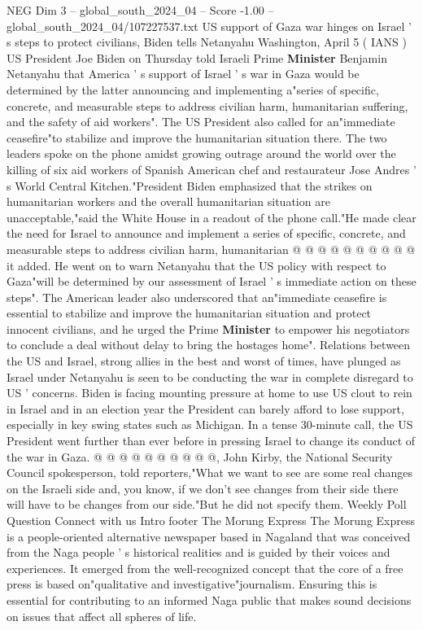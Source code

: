 \begin{textsample}{NEG Dim 3 – global\_south\_2024\_04 – Score -1.00 – global\_south\_2024\_04/107227537.txt}  \label{ex:f3_neg_244}
US support of Gaza war hinges on Israel ' s steps to protect civilians, Biden tells Netanyahu Washington, April 5 ( IANS ) US President Joe Biden on Thursday told Israeli Prime \textbf{Minister} Benjamin Netanyahu that America ' s support of Israel ' s war in Gaza would be determined by the latter announcing and implementing a"series of specific, concrete, and measurable steps to address civilian harm, humanitarian suffering, and the safety of aid workers".
The US President also called for an"immediate ceasefire"to stabilize and improve the humanitarian situation there.
The two leaders spoke on the phone amidst growing outrage around the world over the killing of six aid workers of Spanish American chef and restaurateur Jose Andres ' s World Central Kitchen."President Biden emphasized that the strikes on humanitarian workers and the overall humanitarian situation are unacceptable,"said the White House in a readout of the phone call."He made clear the need for Israel to announce and implement a series of specific, concrete, and measurable steps to address civilian harm, humanitarian @ @ @ @ @ @ @ @ @ @ it added.
He went on to warn Netanyahu that the US policy with respect to Gaza"will be determined by our assessment of Israel ' s immediate action on these steps".
The American leader also underscored that an"immediate ceasefire is essential to stabilize and improve the humanitarian situation and protect innocent civilians, and he urged the Prime \textbf{Minister} to empower his negotiators to conclude a deal without delay to bring the hostages home".
Relations between the US and Israel, strong allies in the best and worst of times, have plunged as Israel under Netanyahu is seen to be conducting the war in complete disregard to US ' concerns.
Biden is facing mounting pressure at home to use US clout to rein in Israel and in an election year the President can barely afford to lose support, especially in key swing states such as Michigan.
In a tense 30-minute call, the US President went further than ever before in pressing Israel to change its conduct of the war in Gaza. @ @ @ @ @ @ @ @ @ @, John Kirby, the National Security Council spokesperson, told reporters,"What we want to see are some real changes on the Israeli side and, you know, if we don't see changes from their side there will have to be changes from our side."But he did not specify them.
Weekly Poll Question Connect with us Intro footer The Morung Express The Morung Express is a people-oriented alternative newspaper based in Nagaland that was conceived from the Naga people ' s historical realities and is guided by their voices and experiences.
It emerged from the well-recognized concept that the core of a free press is based on"qualitative and investigative"journalism.
Ensuring this is essential for contributing to an informed Naga public that makes sound decisions on issues that affect all spheres of life.

\end{textsample}
